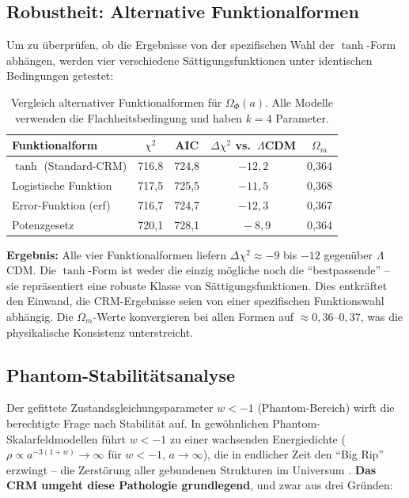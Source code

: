 \documentclass[aps,prd,twocolumn,superscriptaddress,nofootinbib]{revtex4-2}
\begin{document}
\subsection{Robustheit: Alternative Funktionalformen}
\label{subsec:funktionalformen}

Um zu \"uberpr\"ufen, ob die Ergebnisse von der spezifischen Wahl der $\tanh$-Form abh\"angen, werden vier verschiedene S\"attigungsfunktionen unter identischen Bedingungen getestet:

\begin{table}[H]
\centering
\caption{Vergleich alternativer Funktionalformen f\"ur $\Omega_\Phi(a)$. Alle Modelle verwenden die Flachheitsbedingung und haben $k=4$ Parameter.}
\label{tab:funcforms}
\begin{tabular}{lcccc}
\toprule
\textbf{Funktionalform} & $\chi^2$ & AIC & $\Delta\chi^2$ vs.\ $\Lambda$CDM & $\Omega_m$ \\
\midrule
$\tanh$ (Standard-CRM) & 716,8 & 724,8 & $-12{,}2$ & 0,364 \\
Logistische Funktion & 717,5 & 725,5 & $-11{,}5$ & 0,368 \\
Error-Funktion (erf) & 716,7 & 724,7 & $-12{,}3$ & 0,367 \\
Potenzgesetz & 720,1 & 728,1 & $\phantom{0}-8{,}9$ & 0,364 \\
\bottomrule
\end{tabular}
\end{table}

\textbf{Ergebnis:} Alle vier Funktionalformen liefern $\Delta\chi^2 \approx -9$ bis $-12$ gegen\"uber $\Lambda$CDM. Die $\tanh$-Form ist weder die einzig m\"ogliche noch die ``bestpassende'' -- sie repr\"asentiert eine robuste Klasse von S\"attigungsfunktionen. Dies entkr\"aftet den Einwand, die CRM-Ergebnisse seien von einer spezifischen Funktionswahl abh\"angig. Die $\Omega_m$-Werte konvergieren bei allen Formen auf $\approx 0{,}36$--$0{,}37$, was die physikalische Konsistenz unterstreicht.

\subsection{Phantom-Stabilit\"atsanalyse}
\label{subsec:phantom}

Der gefittete Zustandsgleichungsparameter $w < -1$ (Phantom-Bereich) wirft die berechtigte Frage nach Stabilit\"at auf. In gew\"ohnlichen Phantom-Skalarfeldmodellen f\"uhrt $w < -1$ zu einer wachsenden Energiedichte ($\rho \propto a^{-3(1+w)} \to \infty$ f\"ur $w < -1$, $a \to \infty$), die in endlicher Zeit den ``Big Rip'' erzwingt -- die Zerst\"orung aller gebundenen Strukturen im Universum \cite{Caldwell1998}. \textbf{Das CRM umgeht diese Pathologie grundlegend}, und zwar aus drei Gr\"unden:
\end{document}
